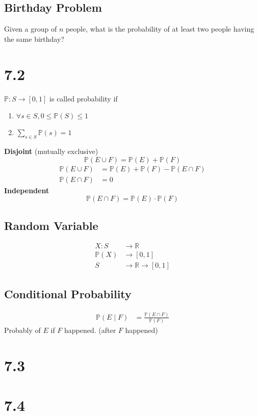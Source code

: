\documentclass{article}
\begin{document}
\subsection{Birthday Problem}

Given a group of $ n $ people, what is the probability of at least two people having the same birthday?

\section{7.2}

$ \mathbb{P} \colon S \rightarrow [0, 1] $ is called probability if
\begin{enumerate}
	\item $ \forall s \in S, 0 \leq \mathbb{P}(S) \leq 1 $
	\item $ \sum_{s \in S} \mathbb{P}(s) = 1 $
\end{enumerate}

\textbf{Disjoint} (mutually exclusive)
\[ \mathbb{P}(E \cup F) = \mathbb{P}(E) + \mathbb{P}(F) \]
\begin{align*}
	\mathbb{P}(E \cup F) & = \mathbb{P}(E) + \mathbb{P}(F) - \mathbb{P}(E \cap F) \\
	\mathbb{P}(E \cap F) & = 0
\end{align*}
\textbf{Independent}
\[ \mathbb{P}(E \cap F) = \mathbb{P}(E) \cdot \mathbb{P}(F) \]

\subsection{Random Variable}

\begin{align*}
	X \colon S    & \rightarrow \mathbb{R}                    \\
	\mathbb{P}(X) & \rightarrow [0, 1]                        \\
	S             & \rightarrow \mathbb{R} \rightarrow [0, 1]
\end{align*}

\subsection{Conditional Probability}

\begin{align*}
	\mathbb{P}(E \mid F) & = \frac{ \mathbb{P}(E \cap F) }{ \mathbb{P}(F) }
\end{align*}
Probably of $ E $ if $ F $ happened. (after $ F $ happened)

\section{7.3}

\section{7.4}
\end{document}
